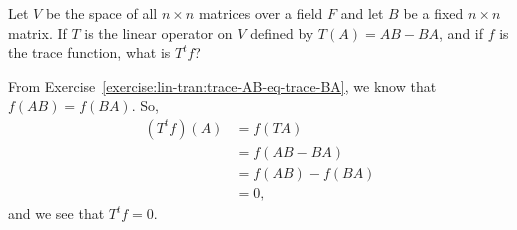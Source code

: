  Let $V$ be the space of all $n\times n$ matrices over a
field $F$ and let $B$ be a fixed $n\times n$ matrix. If $T$ is the
linear operator on $V$ defined by $T(A) = AB - BA$, and if $f$ is the
trace function, what is $T^tf$?
\begin{solution}
  From Exercise~\ref{exercise:lin-tran:trace-AB-eq-trace-BA}, we know
  that $f(AB) = f(BA)$. So,
  \begin{align*}
    (T^tf)(A)
    &= f(TA) \\
    &= f(AB - BA) \\
    &= f(AB) - f(BA) \\
    &= 0,
  \end{align*}
  and we see that $T^tf = 0$.
\end{solution}

